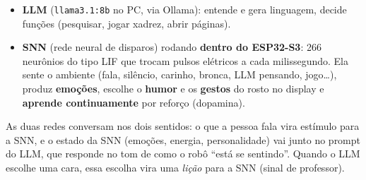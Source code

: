 \documentclass[11pt,a4paper]{article}
\begin{document}
\begin{itemize}
  \item \textbf{LLM} (\texttt{llama3.1:8b} no PC, via Ollama): entende e gera linguagem, decide funções (pesquisar, jogar xadrez, abrir páginas).
  \item \textbf{SNN} (rede neural de disparos) rodando \textbf{dentro do ESP32-S3}: 266 neurônios do tipo LIF que trocam pulsos elétricos
        a cada milissegundo. Ela sente o ambiente (fala, silêncio, carinho, bronca, LLM pensando, jogo…), produz \textbf{emoções},
        escolhe o \textbf{humor} e os \textbf{gestos} do rosto no display e \textbf{aprende continuamente} por reforço (dopamina).
\end{itemize}

As duas redes conversam nos dois sentidos: o que a pessoa fala vira estímulo para a SNN, e o estado da SNN (emoções, energia,
personalidade) vai junto no prompt do LLM, que responde no tom de como o robô “está se sentindo”. Quando o LLM escolhe uma cara, essa
escolha vira uma \emph{lição} para a SNN (sinal de professor).
\end{document}
